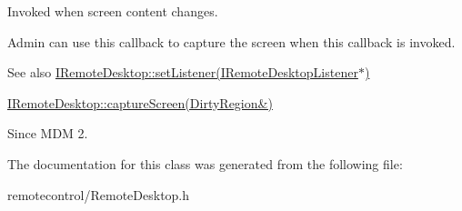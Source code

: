 \-Invoked when screen content changes. 

\-Admin can use this callback to capture the screen when this callback is invoked. \begin{DoxySeeAlso}{\-See also}
\hyperlink{classandroid_1_1IRemoteDesktop_a65c43b7be3fa4210a7e0176a0d928955}{\-I\-Remote\-Desktop\-::set\-Listener(\-I\-Remote\-Desktop\-Listener$\ast$)} 

\hyperlink{classandroid_1_1IRemoteDesktop_af777e36a552194cf99e603351259b568}{\-I\-Remote\-Desktop\-::capture\-Screen(\-Dirty\-Region\&)} 
\end{DoxySeeAlso}
\begin{DoxySince}{\-Since}
\-M\-D\-M 2. 
\end{DoxySince}


\-The documentation for this class was generated from the following file\-:\begin{DoxyCompactItemize}
\item 
remotecontrol/\-Remote\-Desktop.\-h\end{DoxyCompactItemize}
